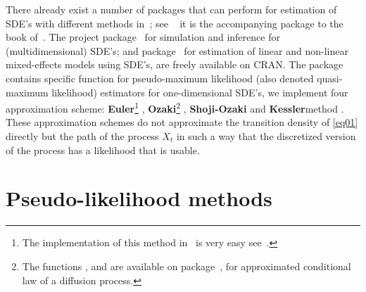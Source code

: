 There already exist a number of packages that can perform for estimation of SDE's with different methods in~\cite{R}; see ~\citep{Stefano2009} it is the accompanying package to the book of~\citep{Stefano2008}. The  project package~\citep{Stefano2014} for simulation and inference for (multidimensional) SDE's; and  package~\citep{StigandSoren2013} for estimation of linear and non-linear mixed-effects models using SDE's, are freely available on CRAN. The package ~\citep{Sim.DiffProc} contains specific function  for pseudo-maximum likelihood (also denoted quasi-maximum likelihood) estimators for one-dimensional SDE's, we implement four approximation scheme: \textbf{Euler}\footnote{The implementation of this method in \R~is very easy see~\citet[p. 122]{Stefano2008}.} \citep{Florens1989,Yoshida1992}, \textbf{Ozaki}\footnote[2]{The functions ,  and  are available on  package~\citet{Stefano2009}, for approximated conditional law of a diffusion process.} \citep{Ozaki1992}, \textbf{Shoji-Ozaki}\footnotemark[2] \citep{ShojiandOzaki1998} and \textbf{Kessler}\footnotemark[2] method \citep{Kessler1997}. These approximation schemes do not approximate the transition density of \eqref{eq01} directly but the path of the process $X_t$ in such a way that the discretized version of the process has a likelihood that is usable.

\section{Pseudo-likelihood methods}


